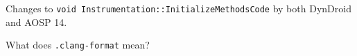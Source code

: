 Changes to \texttt{void Instrumentation::InitializeMethodsCode} by both DynDroid and AOSP 14.

What does \texttt{.clang-format} mean?

% 










